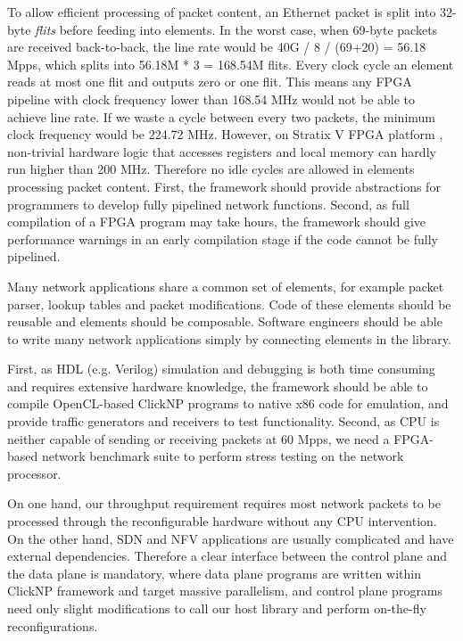 { To allow efficient processing of packet content, an Ethernet packet is split into 32-byte \textit{flits} before feeding into elements. In the worst case, when 69-byte packets are received back-to-back, the line rate would be 40G / 8 / (69+20) = 56.18 Mpps, which splits into 56.18M * 3 = 168.54M flits. Every clock cycle an element reads at most one flit and outputs zero or one flit. This means any FPGA pipeline with clock frequency lower than 168.54 MHz would not be able to achieve line rate. If we waste a cycle between every two packets, the minimum clock frequency would be 224.72 MHz. However, on Stratix V FPGA platform \cite{stratix2012device}, non-trivial hardware logic that accesses registers and local memory can hardly run higher than 200 MHz. Therefore no idle cycles are allowed in elements processing packet content. First, the framework should provide abstractions for programmers to develop fully pipelined network functions. Second, as full compilation of a FPGA program may take hours, the framework should give performance warnings in an early compilation stage if the code cannot be fully pipelined.

 Many network applications share a common set of elements, for example packet parser, lookup tables and packet modifications. Code of these elements should be reusable and elements should be composable. Software engineers should be able to write many network applications simply by connecting elements in the library.

 First, as HDL (e.g. Verilog) simulation and debugging is both time consuming and requires extensive hardware knowledge, the framework should be able to compile OpenCL-based ClickNP programs to native x86 code for emulation, and provide traffic generators and receivers to test functionality. Second, as CPU is neither capable of sending or receiving packets at 60 Mpps, we need a FPGA-based network benchmark suite to perform stress testing on the network processor.

 On one hand, our throughput requirement requires most network packets to be processed through the reconfigurable hardware without any CPU intervention. On the other hand, SDN and NFV applications are usually complicated and have external dependencies. Therefore a clear interface between the control plane and the data plane is mandatory, where data plane programs are written within ClickNP framework and target massive parallelism, and control plane programs need only slight modifications to call our host library and perform on-the-fly reconfigurations.

}
